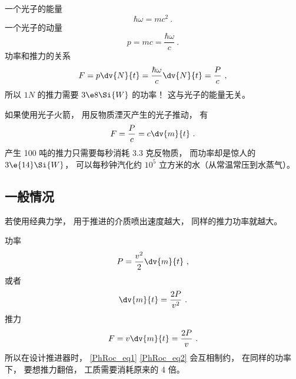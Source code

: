 
\begin{issues}
\issueDraft
\end{issues}

一个光子的能量
\begin{equation}
\hbar\omega = mc^2~.
\end{equation}
一个光子的动量
\begin{equation}
p = mc = \frac{\hbar\omega}{c}~.
\end{equation}
功率和推力的关系
\begin{equation}
F = p \dv{N}{t} = \frac{\hbar\omega}{c}\dv{N}{t} = \frac{P}{c}~,
\end{equation}
所以 $1N$ 的推力需要 $3\e8\Si{W}$ 的功率！ 这与光子的能量无关。

如果使用光子火箭， 用反物质湮灭产生的光子推动， 有
\begin{equation}
F = \frac{P}{c} = c\dv{m}{t}~.
\end{equation}
产生 100 吨的推力只需要每秒消耗 3.3 克反物质， 而功率却是惊人的 $3\e{14}\Si{W}$， 可以每秒钟汽化约 $10^5$ 立方米的水（从常温常压到水蒸气）。

\subsection{一般情况}
若使用经典力学， 用于推进的介质喷出速度越大， 同样的推力功率就越大。

功率
\begin{equation}
P = \frac{v^2}{2}\dv{m}{t}~,
\end{equation}
或者
\begin{equation}\label{PhRoc_eq1}
\dv{m}{t} = \frac{2P}{v^2}~.
\end{equation}
推力
\begin{equation}\label{PhRoc_eq2}
F = v\dv{m}{t} = \frac{2P}{v}~.
\end{equation}
所以在设计推进器时， \autoref{PhRoc_eq1} \autoref{PhRoc_eq2} 会互相制约， 在同样的功率下， 要想推力翻倍， 工质需要消耗原来的 4 倍。

